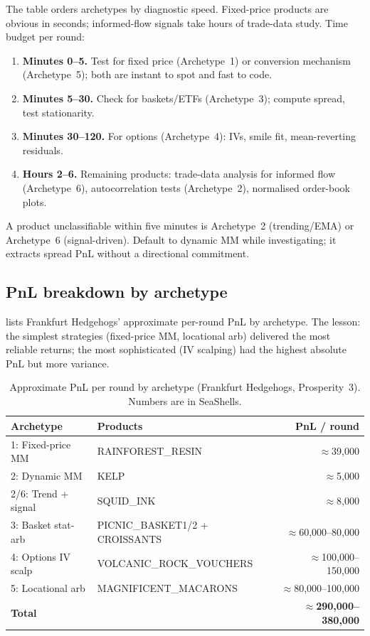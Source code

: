\noindent
The table orders archetypes by diagnostic speed.  Fixed-price
products are obvious in seconds; informed-flow signals take hours of
trade-data study.  Time budget per round:

\begin{enumerate}
  \item \textbf{Minutes 0--5.}  Test for fixed price (Archetype~1) or
  conversion mechanism (Archetype~5); both are instant to spot and
  fast to code.
  \item \textbf{Minutes 5--30.}  Check for baskets/ETFs
  (Archetype~3); compute spread, test stationarity.
  \item \textbf{Minutes 30--120.}  For options (Archetype~4): IVs,
  smile fit, mean-reverting residuals.
  \item \textbf{Hours 2--6.}  Remaining products: trade-data analysis
  for informed flow (Archetype~6), autocorrelation tests
  (Archetype~2), normalised order-book plots.
\end{enumerate}

\begin{keyfactbox}
A product unclassifiable within five minutes is Archetype~2
(trending/EMA) or Archetype~6 (signal-driven).  Default to dynamic
MM while investigating; it extracts spread PnL without a directional
commitment.
\end{keyfactbox}

\subsection{PnL breakdown by archetype}

 lists Frankfurt Hedgehogs' approximate
per-round PnL by archetype.  The lesson: the simplest strategies
(fixed-price MM, locational arb) delivered the most reliable
returns; the most sophisticated (IV scalping) had the highest
absolute PnL but more variance.

\begin{table}[htbp]
\centering
\small
\caption{Approximate PnL per round by archetype (Frankfurt Hedgehogs,
  Prosperity~3).  Numbers are in SeaShells.}
\label{tab:pnl_archetype}
\begin{tabular}{@{}llr@{}}
\toprule
\textbf{Archetype} & \textbf{Products} &
\textbf{PnL / round} \\
\midrule
1: Fixed-price MM & RAINFOREST\_RESIN & $\approx$39{,}000 \\
2: Dynamic MM & KELP & $\approx$5{,}000 \\
2/6: Trend + signal & SQUID\_INK & $\approx$8{,}000 \\
3: Basket stat-arb & PICNIC\_BASKET1/2 + CROISSANTS &
  $\approx$60{,}000--80{,}000 \\
4: Options IV scalp & VOLCANIC\_ROCK\_VOUCHERS &
  $\approx$100{,}000--150{,}000 \\
5: Locational arb & MAGNIFICENT\_MACARONS &
  $\approx$80{,}000--100{,}000 \\
\midrule
\textbf{Total} & & $\approx$\textbf{290{,}000--380{,}000} \\
\bottomrule
\end{tabular}
\end{table}

